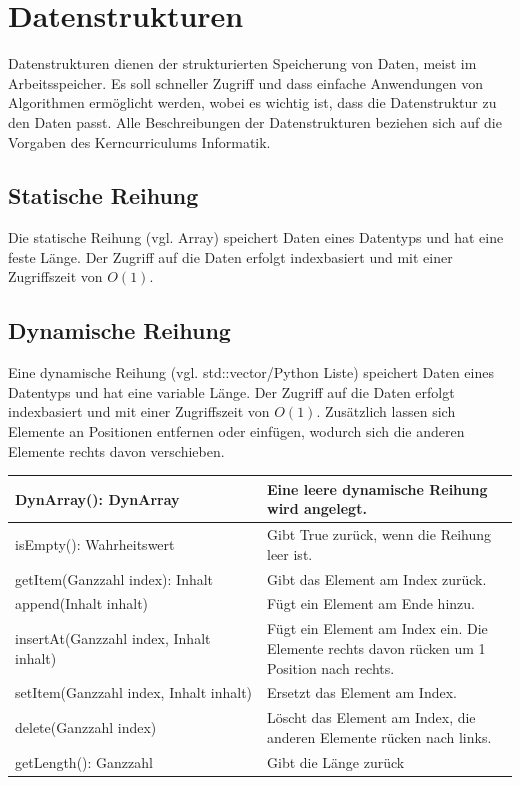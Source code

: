 \section{Datenstrukturen}

Datenstrukturen dienen der strukturierten Speicherung von Daten, meist im Arbeitsspeicher.
Es soll schneller Zugriff und dass einfache Anwendungen von Algorithmen ermöglicht werden,
wobei es wichtig ist, dass die Datenstruktur zu den Daten passt.
Alle Beschreibungen der Datenstrukturen beziehen sich auf die Vorgaben des
Kerncurriculums Informatik.

\subsection{Statische Reihung}

Die statische Reihung (vgl. Array) speichert Daten eines Datentyps und hat
eine feste Länge. Der Zugriff auf die Daten erfolgt indexbasiert und
mit einer Zugriffszeit von $O(1)$.

\subsection{Dynamische Reihung}

Eine dynamische Reihung (vgl. std::vector/Python Liste) speichert Daten eines Datentyps und hat
eine variable Länge. Der Zugriff auf die Daten erfolgt indexbasiert und
mit einer Zugriffszeit von $O(1)$. Zusätzlich lassen sich Elemente an Positionen
entfernen oder einfügen, wodurch sich die anderen Elemente rechts davon verschieben.

\begin{table}[H]
    \begin{tabular}{|p{0.5\linewidth}|p{0.5\linewidth}|}
    \hline
    DynArray(): DynArray & Eine leere dynamische Reihung wird angelegt. \\ \hline
    isEmpty(): Wahrheitswert & Gibt True zurück, wenn die Reihung leer ist. \\ \hline
    getItem(Ganzzahl index): Inhalt & Gibt das Element am Index zurück. \\ \hline
    append(Inhalt inhalt) & Fügt ein Element am Ende hinzu. \\ \hline
    insertAt(Ganzzahl index, Inhalt inhalt) & Fügt ein Element am Index ein. Die Elemente rechts davon rücken um 1 Position nach rechts. \\ \hline
    setItem(Ganzzahl index, Inhalt inhalt) & Ersetzt das Element am Index. \\ \hline
    delete(Ganzzahl index) & Löscht das Element am Index, die anderen Elemente rücken nach links. \\ \hline
    getLength(): Ganzzahl & Gibt die Länge zurück \\ \hline
    \end{tabular}
\end{table}


